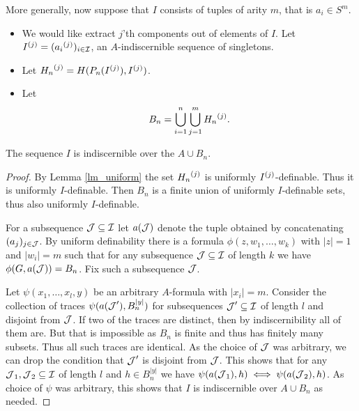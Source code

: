 More generally, now suppose that $I$ consists of tuples of arity $m$, that is $a_i \in S^m$.

\begin{Definition}
  \begin{itemize}
  \item We would like extract $j$'th components out of elements of $I$.
    Let ${I}^{(j)} = ({a_i}^{(j)})_{i \in \operatorname{\mathcal I}}$, an $A$-indiscernible sequence of singletons.
  \item Let ${H_n}^{(j)} = H(P_n({I}^{(j)}), {I}^{(j)})$.
  \item Let
    \begin{align*}
      B_n = \bigcup_{i = 1}^{n} \bigcup_{j = 1}^{m} {H_n}^{(j)}.
    \end{align*}
  \end{itemize}
\end{Definition}

\begin{Lemma} \label{cr_bump}
  The sequence $I$ is indiscernible over the $A \cup B_n$.
\end{Lemma}

\begin{proof}
  By Lemma \ref{lm_uniform} the set ${H_n}^{(j)}$ is uniformly ${I}^{(j)}$-definable.
  Thus it is uniformly $I$-definable.
  Then $B_n$ is a finite union of uniformly $I$-definable sets, thus also uniformly $I$-definable.

  For a subsequence $\operatorname{\mathcal J} \subseteq \operatorname{\mathcal I}$ let $a(\operatorname{\mathcal J})$ denote the tuple obtained by concatenating $(a_j)_{j \in \operatorname{\mathcal J}}$.
  By uniform definability there is a formula $\phi(z, w_1, \ldots , w_k)$ with $|z| = 1$ and $|w_i| = m$ such that
  for any subsequence $\operatorname{\mathcal J} \subseteq \operatorname{\mathcal I}$ of length $k$ we have $\phi(G, a(\operatorname{\mathcal J})) = B_n$.
  Fix such a subsequence $\operatorname{\mathcal J}$.

  Let $\psi(x_1, \ldots, x_l ,y)$ be an arbitrary $A$-formula with $|x_i| = m$. 
  Consider the collection of traces $\psi(a(\operatorname{\mathcal J}'), B_n^{|y|})$ for subsequences $\operatorname{\mathcal J}' \subseteq \operatorname{\mathcal I}$ of length $l$ and disjoint from $\operatorname{\mathcal J}$.
  If two of the traces are distinct, then by indiscernibility all of them are.
  But that is impossible as $B_n$ is finite and thus has finitely many subsets.
  Thus all such traces are identical.
  As the choice of $\operatorname{\mathcal J}$ was arbitrary, we can drop the condition that $\operatorname{\mathcal J}'$ is disjoint from $\operatorname{\mathcal J}$.
  This shows that for any $\operatorname{\mathcal J}_1, \operatorname{\mathcal J}_2 \subseteq \operatorname{\mathcal I}$ of length $l$ and $h \in B_n^{|y|}$ we have $\psi(a(\operatorname{\mathcal J}_1), h) \iff \psi(a(\operatorname{\mathcal J}_2), h)$.
  As choice of $\psi$ was arbitrary, this shows that $I$ is indiscernible over $A \cup B_n$ as needed.
\end{proof}

